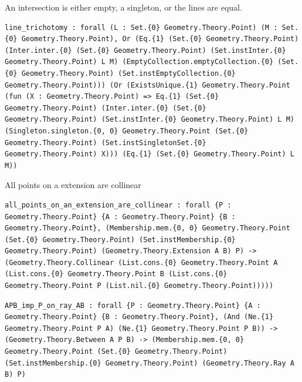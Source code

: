 \begin{theorem}
  \label{Geometry.Theory.Line.line_trichotomy}
  \leanok
  An intersection is either empty, a singleton, or the lines are equal. 
\begin{verbatim}line_trichotomy : forall (L : Set.{0} Geometry.Theory.Point) (M : Set.{0} Geometry.Theory.Point), Or (Eq.{1} (Set.{0} Geometry.Theory.Point) (Inter.inter.{0} (Set.{0} Geometry.Theory.Point) (Set.instInter.{0} Geometry.Theory.Point) L M) (EmptyCollection.emptyCollection.{0} (Set.{0} Geometry.Theory.Point) (Set.instEmptyCollection.{0} Geometry.Theory.Point))) (Or (ExistsUnique.{1} Geometry.Theory.Point (fun (X : Geometry.Theory.Point) => Eq.{1} (Set.{0} Geometry.Theory.Point) (Inter.inter.{0} (Set.{0} Geometry.Theory.Point) (Set.instInter.{0} Geometry.Theory.Point) L M) (Singleton.singleton.{0, 0} Geometry.Theory.Point (Set.{0} Geometry.Theory.Point) (Set.instSingletonSet.{0} Geometry.Theory.Point) X))) (Eq.{1} (Set.{0} Geometry.Theory.Point) L M))\end{verbatim}
\end{theorem}

\begin{theorem}
  \label{Geometry.Theory.Line.all_points_on_an_extension_are_collinear}
  \leanok
  All points on a extension are collinear 
\begin{verbatim}all_points_on_an_extension_are_collinear : forall {P : Geometry.Theory.Point} {A : Geometry.Theory.Point} {B : Geometry.Theory.Point}, (Membership.mem.{0, 0} Geometry.Theory.Point (Set.{0} Geometry.Theory.Point) (Set.instMembership.{0} Geometry.Theory.Point) (Geometry.Theory.Extension A B) P) -> (Geometry.Theory.Collinear (List.cons.{0} Geometry.Theory.Point A (List.cons.{0} Geometry.Theory.Point B (List.cons.{0} Geometry.Theory.Point P (List.nil.{0} Geometry.Theory.Point)))))\end{verbatim}
\end{theorem}

\begin{theorem}
  \label{Geometry.Theory.Line.APB_imp_P_on_ray_AB}
  \leanok
\begin{verbatim}APB_imp_P_on_ray_AB : forall {P : Geometry.Theory.Point} {A : Geometry.Theory.Point} {B : Geometry.Theory.Point}, (And (Ne.{1} Geometry.Theory.Point P A) (Ne.{1} Geometry.Theory.Point P B)) -> (Geometry.Theory.Between A P B) -> (Membership.mem.{0, 0} Geometry.Theory.Point (Set.{0} Geometry.Theory.Point) (Set.instMembership.{0} Geometry.Theory.Point) (Geometry.Theory.Ray A B) P)\end{verbatim}
\end{theorem}

